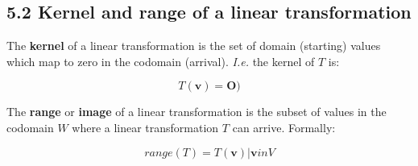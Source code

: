 \subsection{5.2 Kernel and range of a linear transformation}

The \textbf{kernel} of a linear transformation is the set of domain (starting)
values which map to zero in the codomain (arrival). \emph{I.e.} the kernel of
$T$ is:

$$
T(\mathbf{v}) = \mathbf{O})
$$

The \textbf{range} or \textbf{image} of a linear transformation is the
subset of values in the codomain $W$ where a linear transformation $T$ can arrive.
Formally:

$$
range(T) = {T(\mathbf{v}) | \mathbf{v} in V}
$$
